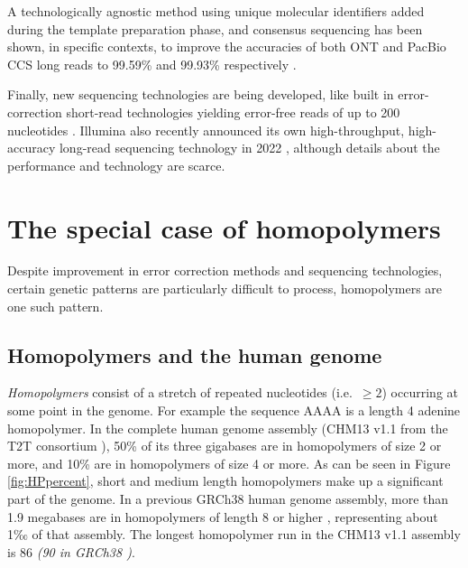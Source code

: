 \documentclass[
  11pt,
  twoside,
  BCOR=10mm,
  listof=totoc]{scrbook}
\begin{document}
A technologically agnostic method using unique molecular identifiers added during the template preparation phase, and consensus sequencing has been shown, in specific contexts, to improve the accuracies of both ONT and PacBio CCS long reads to 99.59\% and 99.93\% respectively \autocite{karstHighaccuracyLongreadAmplicon2021}.

Finally, new sequencing technologies are being developed, like built in error-correction short-read technologies yielding error-free reads of up to 200 nucleotides \autocite{chenHighlyAccurateFluorogenic2017}. Illumina also recently announced its own high-throughput, high-accuracy long-read sequencing technology in 2022 \autocite{HighPerformanceLong}, although details about the performance and technology are scarce.

\hypertarget{the-special-case-of-homopolymers}{%
\section{The special case of homopolymers}\label{the-special-case-of-homopolymers}}

Despite improvement in error correction methods and sequencing technologies, certain genetic patterns are particularly difficult to process, homopolymers are one such pattern.

\hypertarget{homopolymers-and-the-human-genome}{%
\subsection{Homopolymers and the human genome}\label{homopolymers-and-the-human-genome}}

\emph{Homopolymers} consist of a stretch of repeated nucleotides (i.e.~\(\geq 2\)) occurring at some point in the genome. For example the sequence AAAA is a length 4 adenine homopolymer. In the complete human genome assembly (CHM13 v1.1 from the T2T consortium \autocite{nurk2022}), 50\% of its three gigabases are in homopolymers of size 2 or more, and 10\% are in homopolymers of size 4 or more. As can be seen in Figure \ref{fig:HPpercent}, short and medium length homopolymers make up a significant part of the genome. In a previous GRCh38 human genome assembly, more than 1.9 megabases are in homopolymers of length 8 or higher \autocite{booeshaghiPseudoalignmentFacilitatesAssignment2022}, representing about 1‰ of that assembly. The longest homopolymer run in the CHM13 v1.1 assembly is 86 \emph{(90 in GRCh38 \autocite{booeshaghiPseudoalignmentFacilitatesAssignment2022})}.
\end{document}
